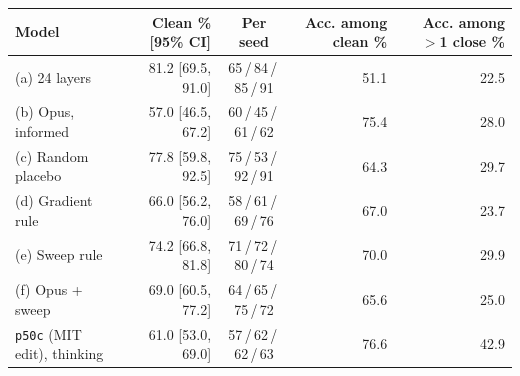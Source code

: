 \begin{tabular}{lrcrr}
\toprule
\textbf{Model} & \textbf{Clean \% [95\% CI]} & \textbf{Per seed} & \textbf{Acc. among clean \%} & \textbf{Acc. among $>$1 close \%} \\
\midrule
(a) 24 layers & 81.2 [69.5, 91.0] & 65\,/\,84\,/\,85\,/\,91 & 51.1 & 22.5 \\
(b) Opus, informed & 57.0 [46.5, 67.2] & 60\,/\,45\,/\,61\,/\,62 & 75.4 & 28.0 \\
(c) Random placebo & 77.8 [59.8, 92.5] & 75\,/\,53\,/\,92\,/\,91 & 64.3 & 29.7 \\
(d) Gradient rule & 66.0 [56.2, 76.0] & 58\,/\,61\,/\,69\,/\,76 & 67.0 & 23.7 \\
(e) Sweep rule & 74.2 [66.8, 81.8] & 71\,/\,72\,/\,80\,/\,74 & 70.0 & 29.9 \\
(f) Opus + sweep & 69.0 [60.5, 77.2] & 64\,/\,65\,/\,75\,/\,72 & 65.6 & 25.0 \\
\midrule
\texttt{p50c} (MIT edit), thinking & 61.0 [53.0, 69.0] & 57\,/\,62\,/\,62\,/\,63 & 76.6 & 42.9 \\
\bottomrule
\end{tabular}
